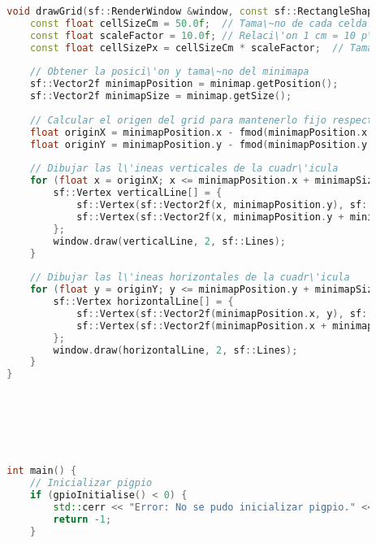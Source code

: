 \begin{lstlisting}[language={C++}, caption={Primer ajuste de c\'odigo}, label={Script}]
        
        
        
        
        
        
        
        
        void drawGrid(sf::RenderWindow &window, const sf::RectangleShape &minimap) {
            const float cellSizeCm = 50.0f;  // Tama\~no de cada celda en cent\'imetros
            const float scaleFactor = 10.0f; // Relaci\'on 1 cm = 10 p\'ixeles en el minimapa
            const float cellSizePx = cellSizeCm * scaleFactor;  // Tama\~no de cada celda en p\'ixeles
        
            // Obtener la posici\'on y tama\~no del minimapa
            sf::Vector2f minimapPosition = minimap.getPosition();
            sf::Vector2f minimapSize = minimap.getSize();
        
            // Calcular el origen del grid para mantenerlo fijo respecto al robot centrado en (105, 105)
            float originX = minimapPosition.x - fmod(minimapPosition.x + 105.0f, cellSizePx);
            float originY = minimapPosition.y - fmod(minimapPosition.y + 105.0f, cellSizePx);
        
            // Dibujar las l\'ineas verticales de la cuadr\'icula
            for (float x = originX; x <= minimapPosition.x + minimapSize.x; x += cellSizePx) {
                sf::Vertex verticalLine[] = {
                    sf::Vertex(sf::Vector2f(x, minimapPosition.y), sf::Color(150, 150, 150, 200)),
                    sf::Vertex(sf::Vector2f(x, minimapPosition.y + minimapSize.y), sf::Color(150, 150, 150, 200))
                };
                window.draw(verticalLine, 2, sf::Lines);
            }
        
            // Dibujar las l\'ineas horizontales de la cuadr\'icula
            for (float y = originY; y <= minimapPosition.y + minimapSize.y; y += cellSizePx) {
                sf::Vertex horizontalLine[] = {
                    sf::Vertex(sf::Vector2f(minimapPosition.x, y), sf::Color(150, 150, 150, 200)),
                    sf::Vertex(sf::Vector2f(minimapPosition.x + minimapSize.x, y), sf::Color(150, 150, 150, 200))
                };
                window.draw(horizontalLine, 2, sf::Lines);
            }
        }
        
        
        
        
        
        
        
        int main() {
            // Inicializar pigpio
            if (gpioInitialise() < 0) {
                std::cerr << "Error: No se pudo inicializar pigpio." << std::endl;
                return -1;
            }
        

\end{lstlisting}
